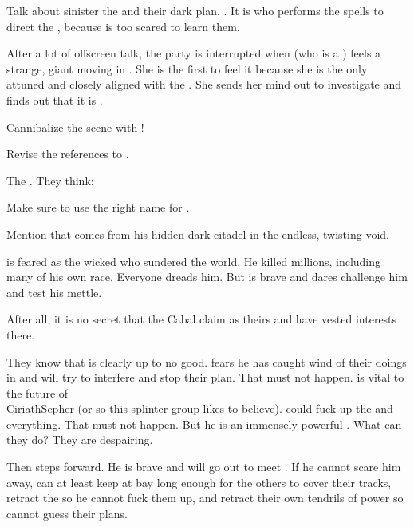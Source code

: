 \begin{changes}
    Talk about sinister the \noggyaleth and their dark plan.
    \Teshrial {}. 
    It is \Urizeth who performs the spells to direct the \noggyaleth, because \Teshrial is too scared to learn them. 
    
    After a lot of offscreen talk, the party is interrupted when \Achsah{} (who is a ) feels a strange, giant \vertex{} moving in \Malcur. 
    She is the first \resphan{} to feel it because she is the only  attuned and closely aligned with the \Malcuric \Nexus. 
    She sends her mind out to investigate and finds out that it is \Ishnaruchaefir. 
    
    Cannibalize the \quo{\VertexSpike} scene with \ChyrieEsmerel! 
    
    Revise the references to . 
    
    The \resphain {}. 
    They think: 
    
    Make sure to use the right name for \WanderersInDarknessEmph. 
    
    Mention that \Ishnaruchaefir comes from his hidden dark citadel in the endless, twisting void. 
    
    \Ishnaruchaefir{} is feared as the wicked  who sundered the world. 
    He killed millions, including many of his own race. 
    Everyone dreads him. 
    But \Teshrial{} is brave and dares challenge him and test his mettle. 
    
    After all, it is no secret that the Cabal claim \Malcur as theirs and have vested interests there. 
  
    They know that \Ishnaruchaefir is clearly up to no good.
    \Urizeth fears he has caught wind of their doings in \Malcur and will try to interfere and stop their plan.
    That must not happen. 
    \Malcur is vital to the future of \\CiriathSepher (or so this splinter group likes to believe). 
    \Ishnaruchaefir could fuck up the \noggyaleth and everything. 
    That must not happen. 
    But he is an immensely powerful \shaeeroth \dragon.
    What can they do?
    They are despairing.
    
    Then \Teshrial steps forward. 
    He is brave and will go out to meet \Ishnaruchaefir. 
    If he cannot scare him away, \Teshrial can at least keep \Ishnaruchaefir at bay long enough for the others to cover their tracks, retract the \noggyaleth so he cannot fuck them up, and retract their own tendrils of \vertex power so \Ishnaruchaefir cannot guess their plans.
    

\end{changes}
